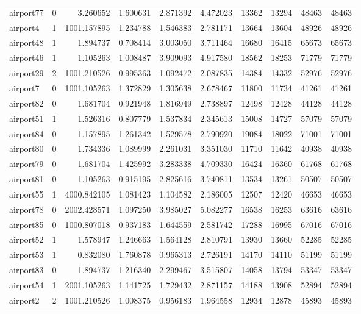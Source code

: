 \begin{longtable}{|l|r|r|r|r|r|r|r|r|r|}
airport77 & 0 & 3.260652 & 1.600631 & 2.871392 & 4.472023 & 13362 & 13294 & 48463 & 48463 \\
airport4 & 1 & 1001.157895 & 1.234788 & 1.546383 & 2.781171 & 13664 & 13604 & 48926 & 48926 \\
airport48 & 1 & 1.894737 & 0.708414 & 3.003050 & 3.711464 & 16680 & 16415 & 65673 & 65673 \\
airport46 & 1 & 1.105263 & 1.008487 & 3.909093 & 4.917580 & 18562 & 18253 & 71779 & 71779 \\
airport29 & 2 & 1001.210526 & 0.995363 & 1.092472 & 2.087835 & 14384 & 14332 & 52976 & 52976 \\
airport7 & 0 & 1001.105263 & 1.372829 & 1.305638 & 2.678467 & 11800 & 11734 & 41261 & 41261 \\
airport82 & 0 & 1.681704 & 0.921948 & 1.816949 & 2.738897 & 12498 & 12428 & 44128 & 44128 \\
airport51 & 1 & 1.526316 & 0.807779 & 1.537834 & 2.345613 & 15008 & 14727 & 57079 & 57079 \\
airport84 & 0 & 1.157895 & 1.261342 & 1.529578 & 2.790920 & 19084 & 18022 & 71001 & 71001 \\
airport80 & 0 & 1.734336 & 1.089999 & 2.261031 & 3.351030 & 11710 & 11642 & 40938 & 40938 \\
airport79 & 0 & 1.681704 & 1.425992 & 3.283338 & 4.709330 & 16424 & 16360 & 61768 & 61768 \\
airport81 & 0 & 1.105263 & 0.915195 & 2.825616 & 3.740811 & 13534 & 13261 & 50507 & 50507 \\
airport55 & 1 & 4000.842105 & 1.081423 & 1.104582 & 2.186005 & 12507 & 12420 & 46653 & 46653 \\
airport78 & 0 & 2002.428571 & 1.097250 & 3.985027 & 5.082277 & 16538 & 16253 & 63616 & 63616 \\
airport85 & 0 & 1000.807018 & 0.937183 & 1.644559 & 2.581742 & 17288 & 16995 & 67016 & 67016 \\
airport52 & 1 & 1.578947 & 1.246663 & 1.564128 & 2.810791 & 13930 & 13660 & 52285 & 52285 \\
airport53 & 1 & 0.832080 & 1.760878 & 0.965313 & 2.726191 & 14170 & 14110 & 51199 & 51199 \\
airport83 & 0 & 1.894737 & 1.216340 & 2.299467 & 3.515807 & 14058 & 13794 & 53347 & 53347 \\
airport54 & 1 & 2001.105263 & 1.141725 & 1.729432 & 2.871157 & 14188 & 13908 & 52894 & 52894 \\
airport2 & 2 & 1001.210526 & 1.008375 & 0.956183 & 1.964558 & 12934 & 12878 & 45893 & 45893 \\

\end{longtable}
